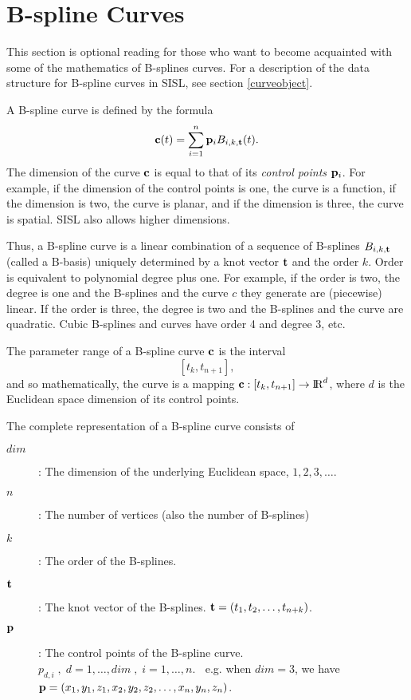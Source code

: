 \section{B-spline Curves}

This section is optional reading for those who want to
become acquainted with some of the mathematics of
B-splines curves. For a description of the data structure for
B-spline curves in SISL, see section \ref{curveobject}.

A B-spline curve is defined by the formula
$$ {\bf c}(t) = \sum_{i=1}^{n} {\bf p}_{i} B_{i,k,{\bf t}}(t). $$
The dimension of the curve ${\bf c}$ is equal to that of its
{\it control points} ${\bf p}_i$. For example, if the dimension of the
control points
is one, the curve is a function, if the dimension is two,
the curve is planar, and if the dimension is three,
the curve is spatial. SISL also allows higher dimensions.

Thus, a B-spline curve is a linear combination of a sequence of B-splines
$B_{i,k,{\bf t}}$ (called a B-basis)
uniquely determined by a knot vector ${\bf t}$ and
the order $k$. Order is equivalent to polynomial degree plus one.
For example, if the order is two, the degree is one and the B-splines
and the curve $c$ they generate are (piecewise) linear.
If the order is three, the degree is two and the B-splines and
the curve are quadratic. Cubic B-splines and
curves have order 4 and degree 3, etc.

The parameter range of a B-spline curve ${\bf c}$ is the interval
$$ [t_k, t_{n+1}], $$
and so mathematically, the curve is a mapping
${\bf c}: [t_k, t_{n+1}] \to \hbox{\rm I\negthinspace R}^d$, where $d$ is the Euclidean space
dimension of its control points.

The complete representation of a B-spline curve consists of
\begin{description}
\item[$dim$]: The dimension of the underlying Euclidean space,
              $1,2,3,\ldots$.
\item[$n$]: The number of vertices (also the number of B-splines)
\item[$k$]: The order of the B-splines.
\item[${\bf t}$]: The knot vector of the B-splines.
            ${\bf t} = (t_1, t_2, \ldots, t_{n+k})$.
\item[${\bf p}$]: The control points of the B-spline curve.
           $p_{d,i}\;,\; d=1,\ldots,dim\;,\;
                i=1,\ldots,n.\;\;$
                e.g. when $dim = 3$, we have
                ${\bf p} = (x_1,y_1,z_1,x_2,y_2,z_2,\ldots,x_n,y_n,z_n)$.
\end{description}

